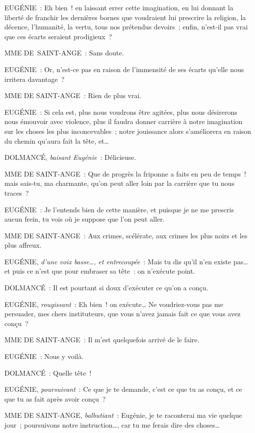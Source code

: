 \documentclass[french,twoside]{book} %
\begin{document}
EUGÉNIE : Eh bien ! en laissant errer cette imagination, en lui donnant la liberté de franchir les dernières bornes que voudraient lui prescrire la religion, la décence, l’humanité, la vertu, tous nos prétendus devoirs ; enfin, n’est-il pas vrai que ces écarts seraient prodigieux ?\par
MME DE SAINT-ANGE : Sans doute.\par
EUGÉNIE : Or, n’est-ce pas en raison de l’immensité de ses écarts qu’elle nous irritera davantage ?\par
MME DE SAINT-ANGE : Rien de plus vrai.\par
EUGÉNIE : Si cela est, plus nous voudrons être agitées, plus nous désirerons nous émouvoir avec violence, plus il faudra donner carrière à notre imagination sur les choses les plus inconcevables ; notre jouissance alors s’améliorera en raison du chemin qu’aura fait la tête, et…\par
DOLMANCÉ, {\itshape baisant Eugénie} : Délicieuse.\par
MME DE SAINT-ANGE : Que de progrès la friponne a faits en peu de temps ! mais sais-tu, ma charmante, qu’on peut aller loin par la carrière que tu nous traces ?\par
EUGÉNIE : Je l’entends bien de cette manière, et puisque je ne me prescris aucun frein, tu vois où je suppose que l’on peut aller.\par
MME DE SAINT-ANGE : Aux crimes, scélérate, aux crimes les plus noirs et les plus affreux.\par
EUGÉNIE, {\itshape d’une voix basse…, et entrecoupée} : Mais tu dis qu’il n’en existe pas… et puis ce n’est que pour embraser sa tête : on n’exécute point.\par
DOLMANCÉ : Il est pourtant si doux d’exécuter ce qu’on a conçu.\par
EUGÉNIE, {\itshape rougissant} : Eh bien ! on exécute… Ne voudriez-vous pas me persuader, mes chers instituteurs, que vous n’avez jamais fait ce que vous avez conçu ?\par
MME DE SAINT-ANGE : Il m’est quelquefois arrivé de le faire.\par
EUGÉNIE : Nous y voilà.\par
DOLMANCÉ : Quelle tête !\par
EUGÉNIE, {\itshape poursuivant} : Ce que je te demande, c’est ce que tu as conçu, et ce que tu as fait après avoir conçu ?\par
MME DE SAINT-ANGE, {\itshape balbutiant} : Eugénie, je te raconterai ma vie quelque jour ; poursuivons notre instruction…, car tu me ferais dire des choses…\par
\end{document}
